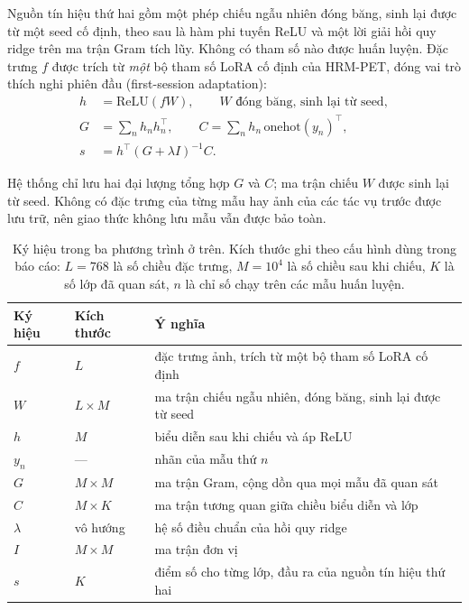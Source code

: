 \documentclass[11pt,a4paper]{article}
\begin{document}
Nguồn tín hiệu thứ hai gồm một phép chiếu ngẫu nhiên đóng băng, sinh lại được từ
một seed cố định, theo sau là hàm phi tuyến ReLU và một lời giải hồi quy ridge
trên ma trận Gram tích lũy. Không có tham số nào được huấn luyện. Đặc trưng $f$
được trích từ \emph{một} bộ tham số LoRA cố định của HRM-PET, đóng vai trò thích
nghi phiên đầu (first-session adaptation):
\begin{align}
h &= \mathrm{ReLU}(f W), \qquad W \text{ đóng băng, sinh lại từ seed},\\
G &= \sum_n h_n h_n^{\top}, \qquad
C = \sum_n h_n\,\mathrm{onehot}(y_n)^{\top},\\
s &= h^{\top} (G + \lambda I)^{-1} C .
\label{eq:rp}
\end{align}

Hệ thống chỉ lưu hai đại lượng tổng hợp $G$ và $C$; ma trận chiếu $W$ được sinh
lại từ seed. Không có đặc trưng của từng mẫu hay ảnh của các tác vụ trước được
lưu trữ, nên giao thức không lưu mẫu vẫn được bảo toàn.

\begin{table}[H]
\centering
\caption{Ký hiệu trong ba phương trình ở trên. Kích thước ghi theo cấu hình dùng
trong báo cáo: $L = 768$ là số chiều đặc trưng, $M = 10^4$ là số chiều sau khi
chiếu, $K$ là số lớp đã quan sát, $n$ là chỉ số chạy trên các mẫu huấn luyện.}
\label{tab:notation}
\begin{tabular}{@{}llp{7.4cm}@{}}
\toprule
Ký hiệu & Kích thước & Ý nghĩa \\
\midrule
$f$        & $L$          & đặc trưng ảnh, trích từ một bộ tham số LoRA cố định \\
$W$        & $L \times M$ & ma trận chiếu ngẫu nhiên, đóng băng, sinh lại được từ seed \\
$h$        & $M$          & biểu diễn sau khi chiếu và áp ReLU \\
$y_n$      & ---          & nhãn của mẫu thứ $n$ \\
$G$        & $M \times M$ & ma trận Gram, cộng dồn qua mọi mẫu đã quan sát \\
$C$        & $M \times K$ & ma trận tương quan giữa chiều biểu diễn và lớp \\
$\lambda$  & vô hướng     & hệ số điều chuẩn của hồi quy ridge \\
$I$        & $M \times M$ & ma trận đơn vị \\
$s$        & $K$          & điểm số cho từng lớp, đầu ra của nguồn tín hiệu thứ hai \\
\bottomrule
\end{tabular}
\end{table}
\end{document}
